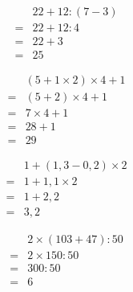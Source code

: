 \begin{multicols}{4}
  \begin{align*}
    &22+12:(7-3)\\
    =&22+12:4\\
    =&22+3\\
    =&25
  \end{align*}
  \vspace{1em}

  \begin{align*}
    &(5+1\times 2)\times 4+1\\
    =&(5+2)\times 4+1\\
    =&7\times 4+1\\
    =&28+1\\
    =&29
  \end{align*}

  \begin{align*}
    &1+(1,3-0,2)\times 2\\
    =&1+1,1\times 2\\
    =&1+2,2\\
    =&3,2
  \end{align*}
  \vspace{1em}

  \begin{align*}
    &2\times (103+47):50\\
    =&2\times 150:50\\
    =&300:50\\
    =&6
  \end{align*}
  \vspace{1em}
\end{multicols}

\separe


